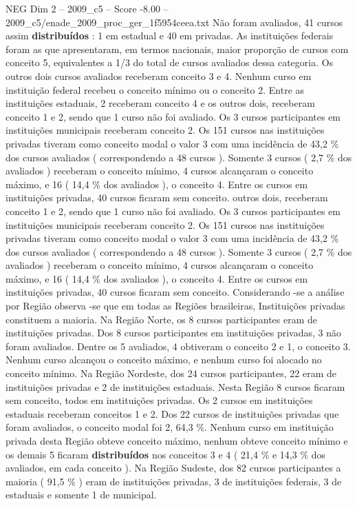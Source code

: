 \begin{textsample}{NEG Dim 2 – 2009\_c5 – Score -8.00 – 2009\_c5/enade\_2009\_proc\_ger\_1f5954ceea.txt}
Não foram avaliados, 41 cursos assim \textbf{distribuídos} : 1 em estadual e 40 em privadas.
As instituições federais foram as que apresentaram, em termos nacionais, maior proporção de cursos com conceito 5, equivalentes a 1/3 do total de cursos avaliados dessa categoria.
Os outros dois cursos avaliados receberam conceito 3 e 4.
Nenhum curso em instituição federal recebeu o conceito mínimo ou o conceito 2.
Entre as instituições estaduais, 2 receberam conceito 4 e os outros dois, receberam conceito 1 e 2, sendo que 1 curso não foi avaliado.
Os 3 cursos participantes em instituições municipais receberam conceito 2.
Os 151 cursos nas instituições privadas tiveram como conceito modal o valor 3 com uma incidência de 43,2 \% dos cursos avaliados ( correspondendo a 48 cursos ).
Somente 3 cursos ( 2,7 \% dos avaliados ) receberam o conceito mínimo, 4 cursos alcançaram o conceito máximo, e 16 ( 14,4 \% dos avaliados ), o conceito 4.
Entre os cursos em instituições privadas, 40 cursos ficaram sem conceito. outros dois, receberam conceito 1 e 2, sendo que 1 curso não foi avaliado.
Os 3 cursos participantes em instituições municipais receberam conceito 2.
Os 151 cursos nas instituições privadas tiveram como conceito modal o valor 3 com uma incidência de 43,2 \% dos cursos avaliados ( correspondendo a 48 cursos ).
Somente 3 cursos ( 2,7 \% dos avaliados ) receberam o conceito mínimo, 4 cursos alcançaram o conceito máximo, e 16 ( 14,4 \% dos avaliados ), o conceito 4.
Entre os cursos em instituições privadas, 40 cursos ficaram sem conceito.
Considerando -se a análise por Região observa -se que em todas as Regiões brasileiras, Instituições privadas constituem a maioria.
Na Região Norte, os 8 cursos participantes eram de instituições privadas.
Dos 8 cursos participantes em instituições privadas, 3 não foram avaliados.
Dentre os 5 avaliados, 4 obtiveram o conceito 2 e 1, o conceito 3.
Nenhum curso alcançou o conceito máximo, e nenhum curso foi alocado no conceito mínimo.
Na Região Nordeste, dos 24 cursos participantes, 22 eram de instituições privadas e 2 de instituições estaduais.
Nesta Região 8 cursos ficaram sem conceito, todos em instituições privadas.
Os 2 cursos em instituições estaduais receberam conceitos 1 e 2.
Dos 22 cursos de instituições privadas que foram avaliados, o conceito modal foi 2, 64,3 \%.
Nenhum curso em instituição privada desta Região obteve conceito máximo, nenhum obteve conceito mínimo e os demais 5 ficaram \textbf{distribuídos} nos conceitos 3 e 4 ( 21,4 \% e 14,3 \% dos avaliados, em cada conceito ).
Na Região Sudeste, dos 82 cursos participantes a maioria ( 91,5 \% ) eram de instituições privadas, 3 de instituições federais, 3 de estaduais e somente 1 de municipal.

\end{textsample}
